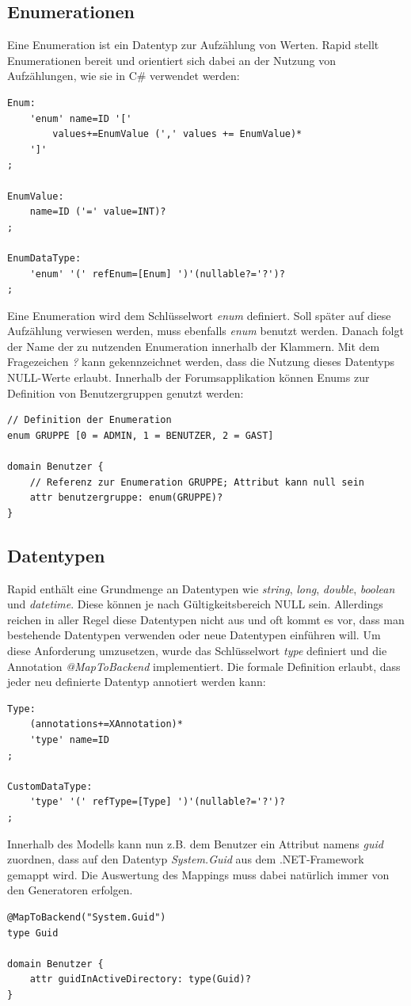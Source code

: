 \documentclass[a4paper,12pt]{scrreprt}
\begin{document}
\subsection{Enumerationen}
\label{sub:enumerationen}
Eine Enumeration ist ein Datentyp zur Aufzählung von Werten. Rapid stellt Enumerationen bereit und orientiert sich dabei an der Nutzung von Aufzählungen, wie sie in C\# verwendet werden:
\begin{verbatim}
Enum:
    'enum' name=ID '[' 
        values+=EnumValue (',' values += EnumValue)* 
    ']'
;

EnumValue:
    name=ID ('=' value=INT)?
;

EnumDataType:
    'enum' '(' refEnum=[Enum] ')'(nullable?='?')?
;
\end{verbatim}
Eine Enumeration wird dem Schlüsselwort \textit{enum} definiert. Soll später auf diese Aufzählung verwiesen werden, muss ebenfalls \textit{enum} benutzt werden. Danach folgt der Name der zu nutzenden Enumeration innerhalb der Klammern. Mit dem Fragezeichen \textit{?} kann gekennzeichnet werden, dass die Nutzung dieses Datentyps NULL-Werte erlaubt.
Innerhalb der Forumsapplikation können Enums zur Definition von Benutzergruppen genutzt werden:
\begin{verbatim}
// Definition der Enumeration
enum GRUPPE [0 = ADMIN, 1 = BENUTZER, 2 = GAST]

domain Benutzer {
    // Referenz zur Enumeration GRUPPE; Attribut kann null sein
    attr benutzergruppe: enum(GRUPPE)?
}
\end{verbatim}
\subsection{Datentypen}
Rapid enthält eine Grundmenge an Datentypen wie \textit{string}, \textit{long}, \textit{double}, \textit{boolean} und \textit{datetime}. Diese können je nach Gültigkeitsbereich NULL sein. Allerdings reichen in aller Regel diese Datentypen nicht aus und oft kommt es vor, dass man bestehende Datentypen verwenden oder neue Datentypen einführen will.
Um diese Anforderung umzusetzen, wurde das Schlüsselwort \textit{type} definiert und die Annotation \textit{@MapToBackend} implementiert. Die formale Definition erlaubt, dass jeder neu definierte Datentyp annotiert werden kann:
\begin{verbatim}
Type:
    (annotations+=XAnnotation)*
    'type' name=ID
;

CustomDataType:
    'type' '(' refType=[Type] ')'(nullable?='?')?
;
\end{verbatim}
Innerhalb des Modells kann nun z.B. dem Benutzer ein Attribut namens \textit{guid} zuordnen, dass auf den Datentyp \textit{System.Guid} aus dem .NET-Framework gemappt wird. Die Auswertung des Mappings muss dabei natürlich immer von den Generatoren erfolgen.
\begin{verbatim}
@MapToBackend("System.Guid")
type Guid

domain Benutzer {
    attr guidInActiveDirectory: type(Guid)?
}
\end{verbatim}
\end{document}
